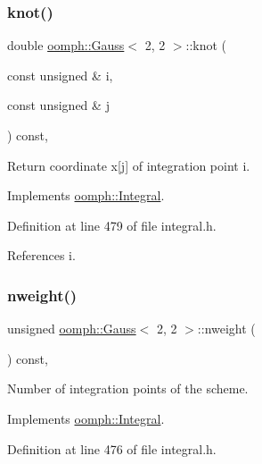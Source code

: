 \subsubsection{\texorpdfstring{knot()}{knot()}}
{\footnotesize\ttfamily double \hyperlink{classoomph_1_1Gauss}{oomph\+::\+Gauss}$<$ 2, 2 $>$\+::knot (\begin{DoxyParamCaption}\item[{const unsigned \&}]{i,  }\item[{const unsigned \&}]{j }\end{DoxyParamCaption}) const\hspace{0.3cm}{\ttfamily [inline]}, {\ttfamily [virtual]}}



Return coordinate x\mbox{[}j\mbox{]} of integration point i. 



Implements \hyperlink{classoomph_1_1Integral_a1a2122f99a87c18649bafdd9ed739758}{oomph\+::\+Integral}.



Definition at line 479 of file integral.\+h.



References i.

\mbox{\label{classoomph_1_1Gauss_3_012_00_012_01_4_a74d916e8b8d259a127a59ead200c0f0d}} 
\subsubsection{\texorpdfstring{nweight()}{nweight()}}
{\footnotesize\ttfamily unsigned \hyperlink{classoomph_1_1Gauss}{oomph\+::\+Gauss}$<$ 2, 2 $>$\+::nweight (\begin{DoxyParamCaption}{ }\end{DoxyParamCaption}) const\hspace{0.3cm}{\ttfamily [inline]}, {\ttfamily [virtual]}}



Number of integration points of the scheme. 



Implements \hyperlink{classoomph_1_1Integral_a1a270de9d99a1fcf1d25a6c1017f65fa}{oomph\+::\+Integral}.



Definition at line 476 of file integral.\+h.

